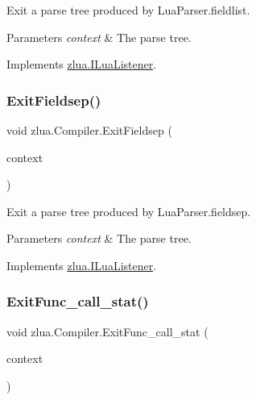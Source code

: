 Exit a parse tree produced by Lua\+Parser.\+fieldlist. 


\begin{DoxyParams}{Parameters}
{\em context} & The parse tree.\\
\hline
\end{DoxyParams}


Implements \mbox{\hyperlink{interfacezlua_1_1_i_lua_listener_a8fbc0020ba9e41655757791877b61985}{zlua.\+I\+Lua\+Listener}}.

\mbox{\label{classzlua_1_1_compiler_a7a8e74fbfd05fe67a5f51db87236b3e8}} 
\subsubsection{\texorpdfstring{Exit\+Fieldsep()}{ExitFieldsep()}}
{\footnotesize\ttfamily void zlua.\+Compiler.\+Exit\+Fieldsep (\begin{DoxyParamCaption}\item[{\mbox{[}\+Not\+Null\mbox{]} \mbox{\hyperlink{classzlua_1_1_lua_parser_1_1_fieldsep_context}{Lua\+Parser.\+Fieldsep\+Context}}}]{context }\end{DoxyParamCaption})}



Exit a parse tree produced by Lua\+Parser.\+fieldsep. 


\begin{DoxyParams}{Parameters}
{\em context} & The parse tree.\\
\hline
\end{DoxyParams}


Implements \mbox{\hyperlink{interfacezlua_1_1_i_lua_listener_a3b2a4e6980def8cb07c26f52be3c22de}{zlua.\+I\+Lua\+Listener}}.

\mbox{\label{classzlua_1_1_compiler_aecbd4798190717227c32cbd132d996dd}} 
\subsubsection{\texorpdfstring{Exit\+Func\+\_\+call\+\_\+stat()}{ExitFunc\_call\_stat()}}
{\footnotesize\ttfamily void zlua.\+Compiler.\+Exit\+Func\+\_\+call\+\_\+stat (\begin{DoxyParamCaption}\item[{\mbox{[}\+Not\+Null\mbox{]} \mbox{\hyperlink{classzlua_1_1_lua_parser_1_1_func__call__stat_context}{Lua\+Parser.\+Func\+\_\+call\+\_\+stat\+Context}}}]{context }\end{DoxyParamCaption})}



